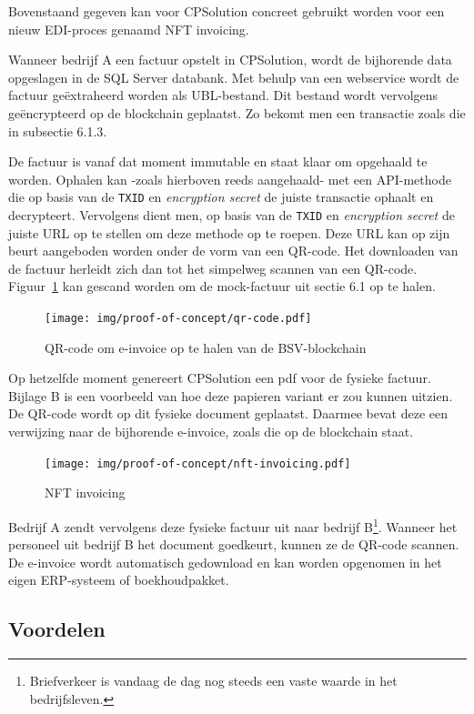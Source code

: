 Bovenstaand gegeven kan voor CPSolution concreet gebruikt worden voor een nieuw EDI-proces genaamd NFT invoicing.

Wanneer bedrijf A een factuur opstelt in CPSolution, wordt de bijhorende data opgeslagen in de SQL Server databank. Met behulp van een webservice wordt de factuur geëxtraheerd worden als UBL-bestand. Dit bestand wordt vervolgens geëncrypteerd op de blockchain geplaatst. Zo bekomt men een transactie zoals die in subsectie 6.1.3. 

De factuur is vanaf dat moment immutable en staat klaar om opgehaald te worden. Ophalen kan -zoals hierboven reeds aangehaald- met een API-methode die op basis van de \verb|TXID| en \textit{encryption secret} de juiste transactie ophaalt en decrypteert. Vervolgens dient men, op basis van de \verb|TXID| en \textit{encryption secret} de juiste URL op te stellen om deze methode op te roepen. Deze URL kan op zijn beurt aangeboden worden onder de vorm van een QR-code. Het downloaden van de factuur herleidt zich dan tot het simpelweg scannen van een QR-code. Figuur~\ref{fig:qr-code} kan gescand worden om de mock-factuur uit sectie 6.1 op te halen.

\begin{figure}[H]
	\centering
	\texttt{[image: img/proof-of-concept/qr-code.pdf]}
	\caption{\label{fig:qr-code}QR-code om e-invoice op te halen van de BSV-blockchain}
\end{figure}

Op hetzelfde moment genereert CPSolution een pdf voor de fysieke factuur. Bijlage B is een voorbeeld van hoe deze papieren variant er zou kunnen uitzien. De QR-code wordt op dit fysieke document geplaatst. Daarmee bevat deze een verwijzing naar de bijhorende e-invoice, zoals die op de blockchain staat.

\begin{figure}[H]
	\centering
	\texttt{[image: img/proof-of-concept/nft-invoicing.pdf]}
	\caption{\label{fig:nft-invoicing}NFT invoicing}
\end{figure}

Bedrijf A zendt vervolgens deze fysieke factuur uit naar bedrijf B\footnote{Briefverkeer is vandaag de dag nog steeds een vaste waarde in het bedrijfsleven.}. Wanneer het personeel uit bedrijf B het document goedkeurt, kunnen ze de QR-code scannen. De e-invoice wordt automatisch gedownload en kan worden opgenomen in het eigen ERP-systeem of boekhoudpakket. 

\subsection{Voordelen}

